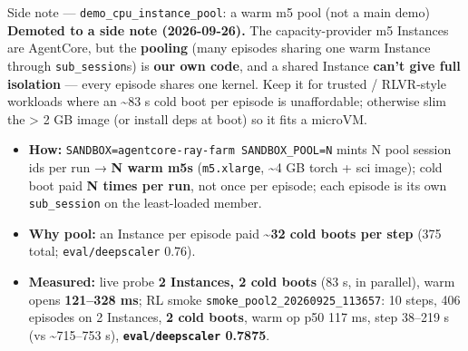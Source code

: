 \documentclass[
  10pt,
  ignorenonframetext,
  aspectratio=169,
  t]{beamer}
\providecommand{\tightlist}{%
  \setlength{\itemsep}{0pt}\setlength{\parskip}{0pt}}
\begin{document}
\begin{frame}{Side note --- \texttt{demo\_cpu\_instance\_pool}:
a warm m5 pool (not a main demo)}
\protect\hypertarget{side-note-demo_cpu_instance_pool-a-warm-m5-pool-not-a-main-demo}{}
\textbf{Demoted to a side note (2026-09-26).} The capacity-provider m5
Instances are AgentCore, but the \textbf{pooling} (many episodes sharing
one warm Instance through \texttt{sub\_session}s) is \textbf{our own
code}, and a shared Instance \textbf{can't give full isolation} ---
every episode shares one kernel. Keep it for trusted / RLVR-style
workloads where an \textasciitilde83 s cold boot per episode is
unaffordable; otherwise slim the \textgreater{} 2 GB image (or install
deps at boot) so it fits a microVM.

\begin{itemize}
\tightlist
\item
  \textbf{How:} \texttt{SANDBOX=agentcore-ray-farm\ SANDBOX\_POOL=N}
  mints N pool session ids per run → \textbf{N warm m5s}
  (\texttt{m5.xlarge}, \textasciitilde4 GB torch + sci image); cold boot
  paid \textbf{N times per run}, not once per episode; each episode is
  its own \texttt{sub\_session} on the least-loaded member.
\item
  \textbf{Why pool:} an Instance per episode paid
  \textasciitilde{}\textbf{32 cold boots per step} (375 total;
  \texttt{eval/deepscaler} 0.76).
\item
  \textbf{Measured:} live probe \textbf{2 Instances, 2 cold boots} (83
  s, in parallel), warm opens \textbf{121--328 ms}; RL smoke
  \texttt{smoke\_pool2\_20260925\_113657}: 10 steps, 406 episodes on 2
  Instances, \textbf{2 cold boots}, warm op p50 117 ms, step 38--219 s
  (vs \textasciitilde715--753 s), \textbf{\texttt{eval/deepscaler}
  0.7875}.
\end{itemize}
\end{frame}
\end{document}
